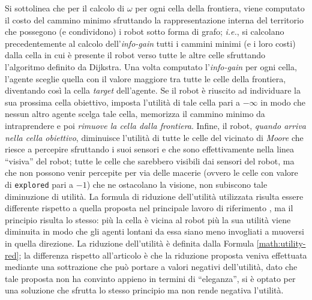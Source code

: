 Si sottolinea che per il calcolo di $\omega$ per ogni cella della frontiera, viene computato il costo del cammino minimo sfruttando la rappresentazione interna del territorio che possegono (e condividono) i robot sotto forma di grafo; \textit{i.e.}, si calcolano precedentemente al calcolo dell'\textit{info-gain} tutti i cammini minimi (e i loro costi) dalla cella in cui è presente il robot verso tutte le altre celle sfruttando l'algoritmo definito da Dijkstra.
Una volta computato l'\textit{info-gain} per ogni cella, l'agente sceglie quella con il valore maggiore tra tutte le celle della frontiera, diventando così la cella \textit{target} dell'agente.
Se il robot è riuscito ad individuare la sua prossima cella obiettivo, imposta l'utilità di tale cella pari a $-\infty$ in modo che nessun altro agente scelga tale cella, memorizza il cammino minimo da intraprendere e poi \textit{rimuove la cella dalla frontiera}.
Infine, il robot, \textit{quando arriva nella cella obiettivo}, diminuisce l'utilità di tutte le celle del vicinato di \textit{Moore} che riesce a percepire sfruttando i suoi sensori e che sono effettivamente nella linea “visiva” del robot; tutte le celle che sarebbero visibili dai sensori del robot, ma che non possono venir percepite per via delle macerie (ovvero le celle con valore di \texttt{explored} pari a $-1$) che ne ostacolano la visione, non subiscono tale diminuzione di utilità.
La formula di riduzione dell'utilità utilizzata risulta essere differente rispetto a quella proposta nel principale lavoro di riferimento \cite{burgard2005}, ma il principio risulta lo stesso: più la cella è vicina al robot più la sua utilità viene diminuita in modo che gli agenti lontani da essa siano meno invogliati a muoversi in quella direzione.
La riduzione dell'utilità è definita dalla Formula \ref{math:utility-red}; la differenza rispetto all'articolo è che la riduzione proposta veniva effettuata mediante una sottrazione che può portare a valori negativi dell'utilità, dato che tale proposta non ha convinto appieno in termini di “eleganza”, si è optato per una soluzione che sfrutta lo stesso principio ma non rende negativa l'utilità. 
